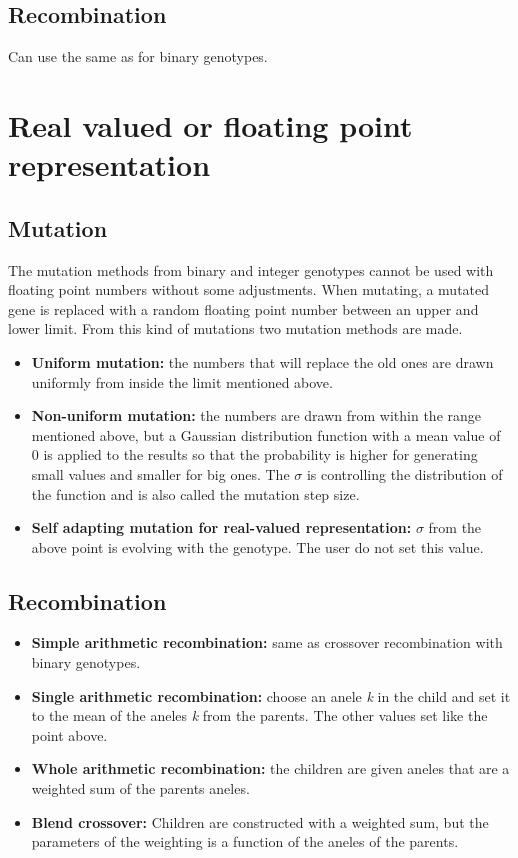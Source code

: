 \documentclass{article}
\begin{document}
   \subsection{Recombination} Can use the same as for binary genotypes.
   \section{Real valued or floating point representation}
   \subsection{Mutation} 
   The mutation methods from binary and integer genotypes cannot be used with floating point numbers without some adjustments. When mutating, a mutated gene is replaced with a random floating point number between an upper and lower limit. From this kind of mutations two mutation methods are made.
   \begin{itemize}
   \item \textbf{Uniform mutation:} the numbers that will replace the old ones are drawn uniformly from inside the limit mentioned above.
   \item \textbf{Non-uniform mutation:} the numbers are drawn from within the range mentioned above, but a Gaussian distribution function with a mean value of 0 is applied to the results so that the probability is higher for generating small values and smaller for big ones. The $\sigma$ is controlling the distribution of the function and is also called the mutation step size.
   \item \textbf{Self adapting mutation for real-valued representation:} $\sigma$ from the above point is evolving with the genotype. The user do not set this value.
   \end{itemize}
   \subsection{Recombination}
   \begin{itemize}
   \item \textbf{Simple arithmetic recombination:} same as crossover recombination with binary genotypes.
   \item \textbf{Single arithmetic recombination:} choose an anele \textit{k} in the child and set it to the mean of the aneles \textit{k} from the parents. The other values set like the point above.
   \item \textbf{Whole arithmetic recombination:} the children are given aneles that are a weighted sum of the parents aneles.
   \item \textbf{Blend crossover:} Children are constructed with a weighted sum, but the parameters of the weighting is a function of the aneles of the parents.
   \end{itemize}
\end{document}
